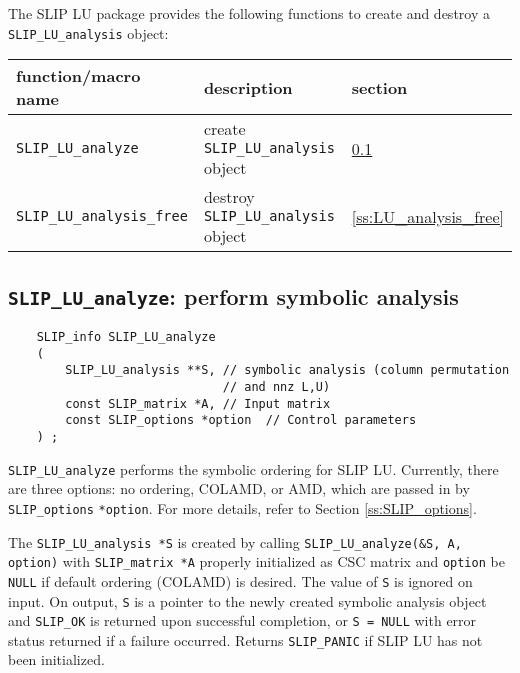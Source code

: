 \documentclass[12pt]{article}
\theoremstyle{definition}
\begin{document}
The SLIP LU package provides the following functions to create and destroy a
\verb|SLIP_LU_analysis| object:

{\small
\begin{center}
\begin{tabular}{lll}
\hline
function/macro name & description & section \\
\hline
\verb|SLIP_LU_analyze|
    & create \verb|SLIP_LU_analysis| object
    & \ref{s:SLIP_LU_analyze} \\
\hline
\verb|SLIP_LU_analysis_free|
    & destroy \verb|SLIP_LU_analysis| object
    & \ref{ss:LU_analysis_free} \\
\hline
\end{tabular}
\end{center}
}

\cprotect\subsection{\verb|SLIP_LU_analyze|: perform symbolic analysis}
\label{s:SLIP_LU_analyze}

\begin{mdframed}[userdefinedwidth=6in]
{\footnotesize
\begin{verbatim}
    SLIP_info SLIP_LU_analyze
    (
        SLIP_LU_analysis **S, // symbolic analysis (column permutation
                              // and nnz L,U)
        const SLIP_matrix *A, // Input matrix
        const SLIP_options *option  // Control parameters
    ) ;
\end{verbatim}
} \end{mdframed}

\verb|SLIP_LU_analyze| performs the symbolic ordering for SLIP LU. Currently,
there are three options: no ordering, COLAMD, or AMD, which are passed in by
\verb|SLIP_options| \verb|*option|. For more details, refer to
Section \ref{ss:SLIP_options}.

The \verb|SLIP_LU_analysis *S| is created by calling
\verb|SLIP_LU_analyze(&S, A, option)| with \verb|SLIP_matrix *A| properly
initialized as CSC matrix and \verb|option| be \verb|NULL| if default ordering
(COLAMD) is desired. The value of \verb|S| is ignored on input.  On output,
\verb|S| is a pointer to the newly created symbolic analysis object and
\verb|SLIP_OK| is returned upon successful completion, or \verb|S = NULL| with
error status returned if a failure occurred.  Returns \verb|SLIP_PANIC| if SLIP
LU has not been initialized.
\end{document}
